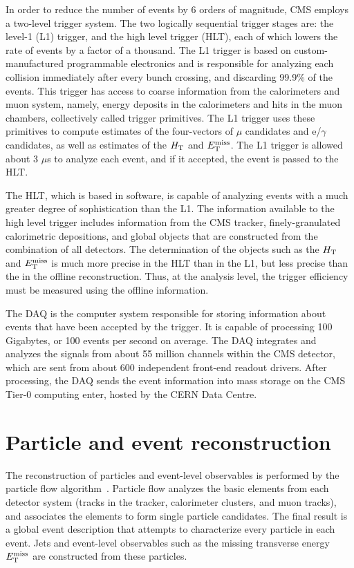 In order to reduce the number of events by 6 orders of magnitude, CMS employs a two-level trigger system. The two logically sequential trigger stages are: the level-1 (L1) trigger, and the high level trigger (HLT), each of which lowers the rate of events by a factor of a thousand. The L1 trigger is based on custom-manufactured programmable electronics and is responsible for analyzing each collision immediately after every bunch crossing, and discarding 99.9\% of the events. This trigger has access to coarse information from the calorimeters and muon system, namely, energy deposits in the calorimeters and hits in the muon chambers, collectively called trigger primitives. The L1 trigger uses these primitives to compute estimates of the four-vectors of $\mu$ candidates and e/$\gamma$ candidates, as well as estimates of the $H_{\rm T}$ and $E_{\text{T}}^{\rm miss}$. The L1 trigger is allowed about 3 $\mu$s to analyze each event, and if it accepted, the event is passed to the HLT. 

The HLT, which is based in software, is capable of analyzing events with a much greater degree of sophistication than the L1. The information available to the high level trigger includes information from the CMS tracker, finely-granulated calorimetric depositions, and global objects that are constructed from the combination of all detectors.  The determination of the objects such as the $H_{\rm T}$ and $E_{\text{T}}^{\rm miss}$ is much more precise in the HLT than in the L1, but less precise than the in the offline reconstruction.  Thus, at the analysis level, the trigger efficiency must be measured using the offline information.

The DAQ is the computer system responsible for storing information about events that have been accepted by the trigger. It is capable of processing 100 Gigabytes, or 100 events per second on average. The DAQ  integrates and analyzes the signals from about 55 million channels within the CMS detector, which are sent from about 600 independent front-end readout drivers. After processing, the DAQ sends the event information into mass storage on the CMS Tier-0 computing  enter, hosted by the CERN Data Centre.

\section{Particle and event reconstruction}
\label{sec:reconstruction}
The reconstruction of particles and event-level observables is performed by the particle flow algorithm~\cite{Beaudette:2014cea}. Particle flow analyzes the basic elements from each detector system (tracks in the tracker, calorimeter clusters, and muon tracks), and associates the elements to form single particle candidates. The final result is a global event description that attempts to characterize every particle in each event. Jets and event-level observables such as the missing transverse energy $E_{\text{T}}^{\rm miss}$ are constructed from these particles. 


